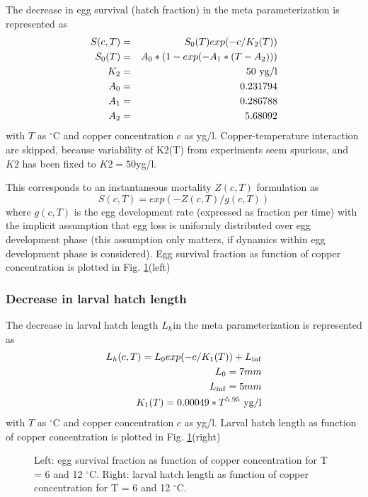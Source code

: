 The decrease in egg survival (hatch fraction) in the meta parameterization is represented as 
\begin{eqnarray*}
          S(c,T) & = & S_0(T) exp(- c / K_2(T))  \\
          S_0(T)  & = & A_0*(1 - exp(-A_1*(T-A_2)))\\
          K_2     & = & 50 {\ \rm yg/l} \\
	  A_0     & = & 0.231794 \\
          A_1     & = & 0.286788 \\
          A_2     & = & 5.68092  \\
\end{eqnarray*}
with $T$ as $^\circ$C and copper concentration $c$ as yg/l.
Copper-temperature interaction are skipped, because variability of K2(T)
from experiments seem spurious, and $K2$ has been fixed to $K2  = 50 $yg/l.

This corresponds to an instantaneous mortality $Z(c,T)$ formulation as 
\begin{equation}
           S(c,T) =  exp( -Z(c,T)/g(c,T) ) \nonumber
\end{equation}
where $g(c,T)$ is the egg development rate (expressed as fraction per time) with the
implicit assumption that egg loss is uniformly distributed over egg development phase
(this assumption only matters, if dynamics within egg development phase is considered).
Egg survival fraction as function of copper concentration is plotted in Fig. \ref{survANDhlen}(left)
\subsubsection{Decrease in larval hatch length} 

The decrease in larval hatch length $L_h$in the meta parameterization is represented as 
\begin{eqnarray*}
 L_h(c,T) = L_0 exp(- c / K_1(T)) + L_{\inf}  \\
 L_0      = 7 mm \\
 L_{\inf}  = 5 mm \\
 K_1(T)   = 0.00049 * T^{5.95} {\ \rm yg/l} \\
\end{eqnarray*}
with $T$ as $^\circ$C and copper concentration $c$ as yg/l.
Larval hatch length as function of copper concentration is plotted in Fig. \ref{survANDhlen}(right)
\begin{figure}[p]   %
\begin{center}                                                 
\end{center}                                                    
\caption{Left: egg survival fraction as function of copper concentration for T = 6 and 12 $^\circ$C.
Right: larval hatch length as function of copper concentration for T = 6 and 12 $^\circ$C.}
\label{survANDhlen}
\end{figure}

